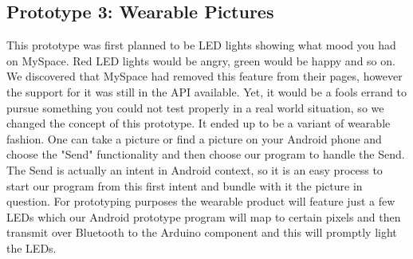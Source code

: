 \subsection{Prototype 3: Wearable Pictures}
This prototype was first planned to be LED lights showing what mood you had on MySpace. Red LED lights would be angry,
 green would be happy and so on. We discovered that MySpace had removed this feature from their pages, however the 
support for it was still in the API available. Yet, it would be a fools errand to pursue something you could not test properly 
in a real world situation, so we changed the concept of this prototype. It ended up to be a variant of wearable fashion. 
One can take a picture or find a picture on your Android phone and choose the "Send" functionality and then choose our 
program to handle the Send. The Send is actually an intent in Android context, so it is an easy process to start our program 
from this first intent and bundle with it the picture in question. For prototyping purposes the wearable product will feature just 
a few LEDs which our Android prototype program will map to certain pixels and then transmit over Bluetooth to the Arduino 
component and this will promptly light the LEDs.
